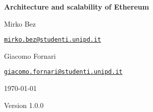 \begin{titlepage}
  \centering
  \vspace*{4cm}
  {\huge\bfseries Architecture and scalability of Ethereum\par}
  \vspace{1.5cm}
  \begin{minipage}{.47\textwidth}
    \centering
    {\Large Mirko Bez\par}
    \vspace{0.15cm}
    {\texttt{\href{mailto:mirko.bez@studenti.unipd.it}{mirko.bez@studenti.unipd.it}}}
  \end{minipage}
  \hfill
  \begin{minipage}{.47\textwidth}
    \centering
    {\Large Giacomo Fornari\par}
    \vspace{0.15cm}
    {\texttt{\href{mailto:giacomo.fornari@studenti.unipd.it}{giacomo.fornari@studenti.unipd.it}}}
  \end{minipage}
  \par
  \vspace{1cm}
  {\large \today}

  \vfill

  {\large Version 1.0.0}
\end{titlepage}